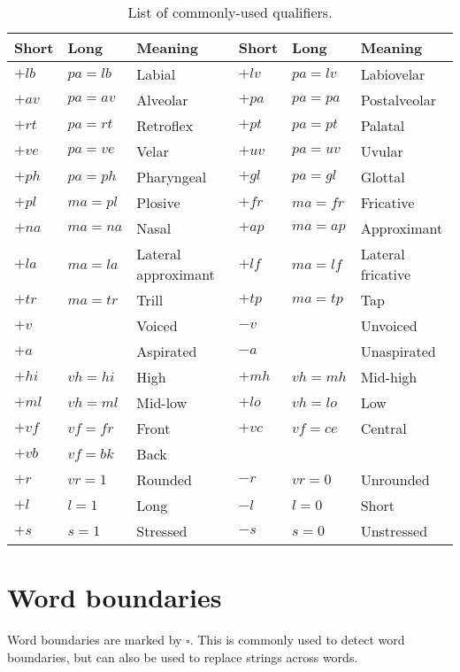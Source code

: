 \documentclass{book}
\begin{document}
\begin{table}[h]
  \caption{List of commonly-used qualifiers.}
  \centering
  \begin{tabu} to \linewidth {|l|l|X||l|l|X|}
    \hline
    Short & Long & Meaning & Short & Long & Meaning \\
    \hline
    $+lb$ & $pa=lb$ & Labial & $+lv$ & $pa=lv$ & Labiovelar \\
    $+av$ & $pa=av$ & Alveolar & $+pa$ & $pa=pa$ & Postalveolar \\
    $+rt$ & $pa=rt$ & Retroflex & $+pt$ & $pa=pt$ & Palatal \\
    $+ve$ & $pa=ve$ & Velar & $+uv$ & $pa=uv$ & Uvular \\
    $+ph$ & $pa=ph$ & Pharyngeal & $+gl$ & $pa=gl$ & Glottal \\
    \hline
    $+pl$ & $ma=pl$ & Plosive & $+fr$ & $ma=fr$ & Fricative \\
    $+na$ & $ma=na$ & Nasal & $+ap$ & $ma=ap$ & Approximant \\
    $+la$ & $ma=la$ & Lateral approximant & $+lf$ & $ma=lf$ & Lateral fricative \\
    $+tr$ & $ma=tr$ & Trill & $+tp$ & $ma=tp$ & Tap \\
    \hline
    $+v$ & & Voiced & $-v$ & & Unvoiced \\
    $+a$ & & Aspirated & $-a$ & & Unaspirated \\
    \hline
    $+hi$ & $vh=hi$ & High & $+mh$ & $vh=mh$ & Mid-high \\
    $+ml$ & $vh=ml$ & Mid-low & $+lo$ & $vh=lo$ & Low \\
    \hline
    $+vf$ & $vf=fr$ & Front & $+vc$ & $vf=ce$ & Central \\
    $+vb$ & $vf=bk$ & Back & & & \\
    \hline
    $+r$ & $vr=1$ & Rounded & $-r$ & $vr=0$ & Unrounded \\
    $+l$ & $l=1$ & Long & $-l$ & $l=0$ & Short \\
    $+s$ & $s=1$ & Stressed & $-s$ & $s=0$ & Unstressed \\
    \hline
  \end{tabu}
\end{table}

\section{Word boundaries}

Word boundaries are marked by $\square$. This is commonly used to detect word boundaries, but can also be used to replace strings across words.
\end{document}
